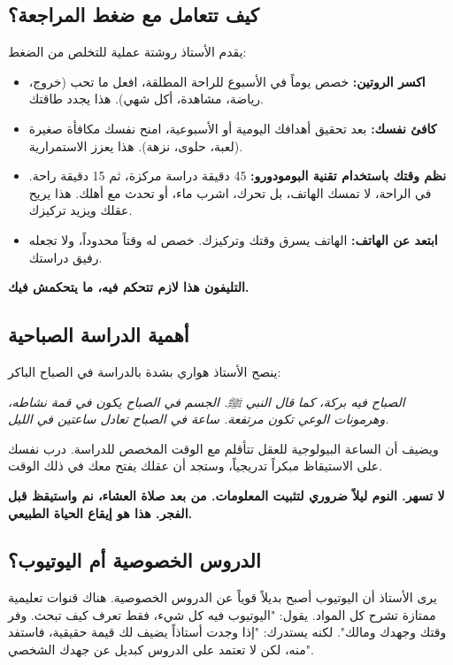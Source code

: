 \documentclass[12pt,a4paper]{book}
\newcommand{\quoteAr}[1]{%
	\begin{myquote}
		\itshape #1
	\end{myquote}
}
\newcommand{\importantAr}[1]{%
	\begin{important}
		\bfseries #1
	\end{important}
}
\begin{document}
\subsection{كيف تتعامل مع ضغط المراجعة؟}

يقدم الأستاذ روشتة عملية للتخلص من الضغط:

\begin{itemize}
	\item \textbf{اكسر الروتين:} خصص يوماً في الأسبوع للراحة المطلقة، افعل ما تحب (خروج، رياضة، مشاهدة، أكل شهي). هذا يجدد طاقتك.
	\item \textbf{كافئ نفسك:} بعد تحقيق أهدافك اليومية أو الأسبوعية، امنح نفسك مكافأة صغيرة (لعبة، حلوى، نزهة). هذا يعزز الاستمرارية.
	\item \textbf{نظم وقتك باستخدام تقنية البومودورو:} 45 دقيقة دراسة مركزة، ثم 15 دقيقة راحة. في الراحة، لا تمسك الهاتف، بل تحرك، اشرب ماء، أو تحدث مع أهلك. هذا يريح عقلك ويزيد تركيزك.
	\item \textbf{ابتعد عن الهاتف:} الهاتف يسرق وقتك وتركيزك. خصص له وقتاً محدوداً، ولا تجعله رفيق دراستك.
\end{itemize}

\importantAr{التليفون هذا لازم تتحكم فيه، ما يتحكمش فيك.}

\subsection{أهمية الدراسة الصباحية}

ينصح الأستاذ هواري بشدة بالدراسة في الصباح الباكر:

\quoteAr{الصباح فيه بركة، كما قال النبي ﷺ. الجسم في الصباح يكون في قمة نشاطه، وهرمونات الوعي تكون مرتفعة. ساعة في الصباح تعادل ساعتين في الليل.}

ويضيف أن الساعة البيولوجية للعقل تتأقلم مع الوقت المخصص للدراسة. درب نفسك على الاستيقاظ مبكراً تدريجياً، وستجد أن عقلك يفتح معك في ذلك الوقت.

\importantAr{لا تسهر. النوم ليلاً ضروري لتثبيت المعلومات. من بعد صلاة العشاء، نم واستيقظ قبل الفجر. هذا هو إيقاع الحياة الطبيعي.}

\subsection{الدروس الخصوصية أم اليوتيوب؟}

يرى الأستاذ أن اليوتيوب أصبح بديلاً قوياً عن الدروس الخصوصية. هناك قنوات تعليمية ممتازة تشرح كل المواد. يقول: "اليوتيوب فيه كل شيء، فقط تعرف كيف تبحث. وفر وقتك وجهدك ومالك". لكنه يستدرك: "إذا وجدت أستاذاً يضيف لك قيمة حقيقية، فاستفد منه، لكن لا تعتمد على الدروس كبديل عن جهدك الشخصي".
\end{document}
